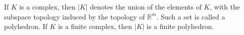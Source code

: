 If $K$ is a complex, then $|K|$ denotes the union of the elements of $K$, with the subspace topology induced by the topology of $\mathbb{R}^m$. Such a set is called a polyhedron. If $K$ is a finite complex, then $|K|$ is a finite polyhedron.

